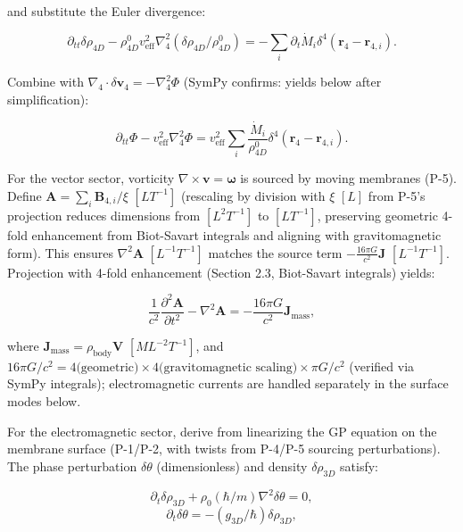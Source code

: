 and substitute the Euler divergence:

\begin{equation}
\partial_{tt} \delta \rho_{4D} - \rho_{4D}^0 v_{\text{eff}}^2 \nabla_4^2 (\delta \rho_{4D} / \rho_{4D}^0) = -\sum_i \partial_t \dot{M}_i \delta^4(\mathbf{r}_4 - \mathbf{r}_{4,i}).
\end{equation}

Combine with $\nabla_4 \cdot \delta \mathbf{v}_4 = -\nabla_4^2 \Phi$ (SymPy confirms: yields below after simplification):

\begin{equation}
\partial_{tt} \Phi - v_{\text{eff}}^2 \nabla_4^2 \Phi = v_{\text{eff}}^2 \sum_i \frac{\dot{M}_i}{\rho_{4D}^0} \delta^4(\mathbf{r}_4 - \mathbf{r}_{4,i}).
\end{equation}

For the vector sector, vorticity $\nabla \times \mathbf{v} = \boldsymbol{\omega}$ is sourced by moving membranes (P-5). Define $\mathbf{A} = \sum_i \mathbf{B}_{4,i} / \xi$ $[L T^{-1}]$ (rescaling by division with $\xi$ $[L]$ from P-5's projection reduces dimensions from $[L^2 T^{-1}]$ to $[L T^{-1}]$, preserving geometric 4-fold enhancement from Biot-Savart integrals and aligning with gravitomagnetic form). This ensures $\nabla^2 \mathbf{A}$ $[L^{-1} T^{-1}]$ matches the source term $-\frac{16\pi G}{c^2} \mathbf{J}$ $[L^{-1} T^{-1}]$. Projection with 4-fold enhancement (Section 2.3, Biot-Savart integrals) yields:

\begin{equation}
\frac{1}{c^2} \frac{\partial^2 \mathbf{A}}{\partial t^2} - \nabla^2 \mathbf{A} = -\frac{16\pi G}{c^2} \mathbf{J}_{\text{mass}},
\end{equation}

where $\mathbf{J}_{\text{mass}} = \rho_{\text{body}} \mathbf{V}$ $[M L^{-2} T^{-1}]$, and $16\pi G/c^2 = 4 \text{(geometric)} \times 4 \text{(gravitomagnetic scaling)} \times \pi G/c^2$ (verified via SymPy integrals); electromagnetic currents are handled separately in the surface modes below.

For the electromagnetic sector, derive from linearizing the GP equation on the membrane surface (P-1/P-2, with twists from P-4/P-5 sourcing perturbations). The phase perturbation $\delta \theta$ (dimensionless) and density $\delta \rho_{3D}$ satisfy:

\begin{equation}
\partial_t \delta \rho_{3D} + \rho_0 (\hbar / m) \nabla^2 \delta \theta = 0,
\end{equation}
\begin{equation}
\partial_t \delta \theta = - (g_{3D} / \hbar) \delta \rho_{3D},
\end{equation}

